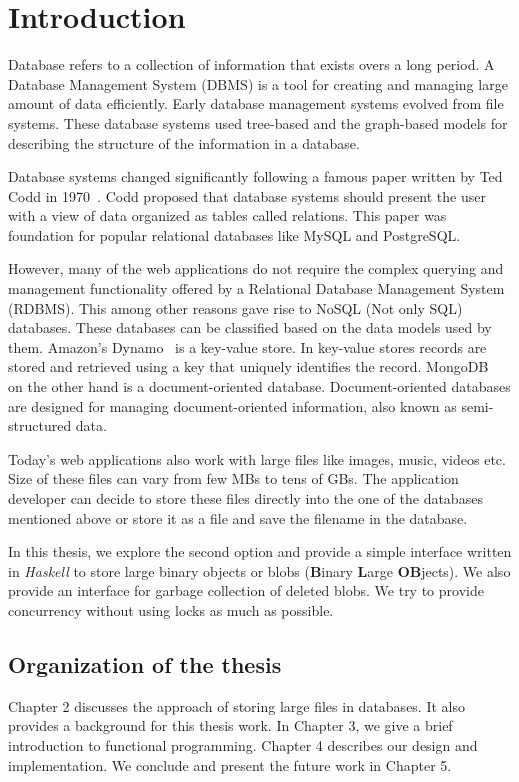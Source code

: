 \chapter{Introduction}
\label{chap:intro}

Database refers to a collection of information that exists overs a long period.
A Database Management System (DBMS) is a tool for creating and managing large amount of data efficiently.
Early database management systems evolved from file systems. These database systems used tree-based and the graph-based models for describing the structure of the information in a database.

Database systems changed significantly following a famous paper written by Ted Codd in 1970~\cite{codd1970relational}. Codd proposed that database systems should present the user with a view of data organized as tables called relations. This paper was foundation for popular relational databases like MySQL and PostgreSQL.

However, many of the web applications do not require the complex querying and management functionality offered by a Relational Database Management System (RDBMS). This among other reasons gave rise to NoSQL (Not only SQL) databases. These databases can be classified based on the data models used by them. Amazon's Dynamo~\cite{decandia2007dynamo} is a key-value store. In key-value stores records are stored and retrieved using a key that uniquely identifies the record.
MongoDB~\cite{chodorow2013mongodb} on the other hand is a document-oriented database. Document-oriented databases are designed for managing document-oriented information, also known as semi-structured data.

Today's web applications also work with large files like images, music, videos etc. Size of these files can vary from few MBs to tens of GBs. The application developer can decide to store these files directly into the one of the databases mentioned above or store it as a file and save the filename in the database.

In this thesis, we explore the second option and provide a simple interface written in \textit{Haskell} to store large binary objects or blobs (\textbf{B}inary \textbf{L}arge \textbf{OB}jects). We also provide an interface for garbage collection of deleted blobs. We try to provide concurrency without using locks as much as possible.

\section{Organization of the thesis}
Chapter 2 discusses the approach of storing large files in databases. It also provides a background for this thesis work. In Chapter 3, we give a brief introduction to functional programming. Chapter 4 describes our design and implementation. We conclude and present the future work in Chapter 5.
